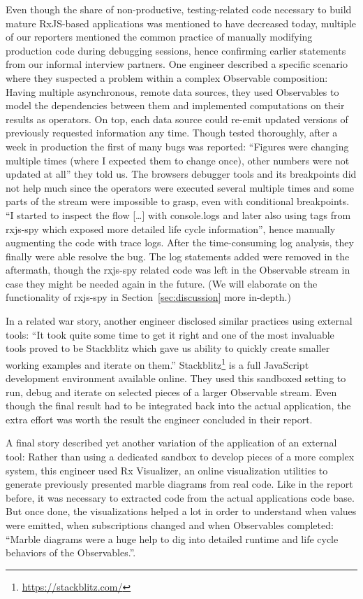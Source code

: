 \documentclass[12pt,a4paper]{article}
\begin{document}
Even though the share of non-productive, testing-related code necessary to build mature RxJS-based applications was mentioned to have decreased today, multiple of our reporters mentioned the common practice of manually modifying production code during debugging sessions, hence confirming earlier statements from our informal interview partners. One engineer described a specific scenario where they suspected a problem within a complex Observable composition: Having multiple asynchronous, remote data sources, they used Observables to model the dependencies between them and implemented computations on their results as operators. On top, each data source could re-emit updated versions of previously requested information any time. Though tested thoroughly, after a week in production the first of many bugs was reported: ``Figures were changing multiple times (where I expected them to change once), other numbers were not updated at all'' they told us. The browsers debugger tools and its breakpoints did not help much since the operators were executed several multiple times and some parts of the stream were impossible to grasp, even with conditional breakpoints. ``I started to inspect the flow [\dots] with console.logs and later also using tags from rxjs-spy which exposed more detailed life cycle information'', hence manually augmenting the code with trace logs. After the time-consuming log analysis, they finally were able resolve the bug. The log statements added were removed in the aftermath, though the rxjs-spy related code was left in the Observable stream in case they might be needed again in the future. (We will elaborate on the functionality of rxjs-spy in Section~\ref{sec:discussion} more in-depth.)

In a related war story, another engineer disclosed similar practices using  external tools: ``It took quite some time to get it right and one of the most invaluable tools proved to be Stackblitz which gave us ability to quickly create smaller working examples and iterate on them.'' Stackblitz\footnote{\url{https://stackblitz.com/}} is a full JavaScript development environment available online. They used this sandboxed setting to run, debug and iterate on selected pieces of a larger Observable stream. Even though the final result had to be integrated back into the actual application, the extra effort was worth the result the engineer concluded in their report.

A final story described yet another variation of the application of an external tool: Rather than using a dedicated sandbox to develop pieces of a more complex system, this engineer used Rx Visualizer, an online visualization utilities to generate previously presented marble diagrams from real code. Like in the report before, it was necessary to extracted code from the actual applications code base. But once done, the visualizations helped a lot in order to understand when values were emitted, when subscriptions changed and when Observables completed: ``Marble diagrams were a huge help to dig into detailed runtime and life cycle behaviors of the Observables.''.
\end{document}
